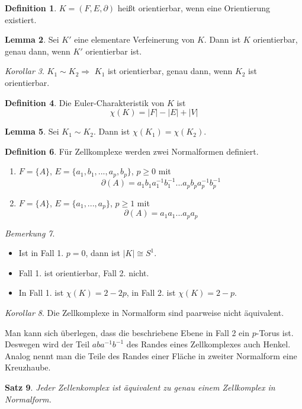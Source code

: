 \documentclass[a4paper, 12pt]{article}
\theoremstyle{plain}
\newtheorem{theorem}{Satz}[section] %
\theoremstyle{definition}
\newtheorem{definition}[theorem]{Definition} %
\theoremstyle{lemma}
\newtheorem{lemma}[theorem]{Lemma}
\theoremstyle{remark}
\newtheorem{remark}[theorem]{Bemerkung}
\theoremstyle{corollary}
\newtheorem{corollary}[theorem]{Korollar}
\theoremstyle{example}
\begin{document}
	\begin{definition}
		$K=(F,E,\partial)$ heißt orientierbar, wenn eine Orientierung existiert.
	\end{definition}
	\begin{lemma}
		Sei $K'$ eine elementare Verfeinerung von $K$. Dann ist $K$ orientierbar, genau dann, wenn $K'$ orientierbar ist.
	\end{lemma}
	\begin{corollary}
		$K_1 \sim K_2 \Rightarrow$ $K_1$ ist orientierbar, genau dann, wenn $K_2$ ist orientierbar.
	\end{corollary}
	\begin{definition}
		Die Euler-Charakteristik von $K$ ist \[\chi(K) = \left|F\right| - \left|E\right| + \left|V\right|\]
	\end{definition}
	\begin{lemma}
		Sei $K_1 \sim K_2$. Dann ist $\chi(K_1) = \chi(K_2)$.
	\end{lemma}
	\begin{definition}
		Für Zellkomplexe werden zwei Normalformen definiert.
		\begin{enumerate}
			\item $F = \{A\}$, $E = \{a_1,b_1,...,a_p,b_p\}$, $p \geq 0$ mit $$\partial(A) = a_1b_1a_1^{-1}b_1^{-1}...a_pb_pa_p^{-1}b_p^{-1}$$
			\item $F = \{A\}$, $E = \{a_1,...,a_p\}$, $p \geq 1$ mit $$\partial(A) = a_1a_1...a_pa_p$$
		\end{enumerate}
	\end{definition}
	\begin{remark}
		\begin{itemize}
			\item Ist in Fall 1. $p=0$, dann ist $\left|K\right| \cong S^1$.
			\item Fall 1. ist orientierbar, Fall 2. nicht.
			\item In Fall 1. ist $\chi(K) = 2-2p$, in Fall 2. ist $\chi(K) = 2-p$.
		\end{itemize}
	\end{remark}
	\begin{corollary}
		Die Zellkomplexe in Normalform sind paarweise nicht äquivalent.
	\end{corollary}
	Man kann sich überlegen, dass die beschriebene Ebene in Fall 2 ein $p$-Torus ist. Deswegen wird der Teil $aba^{-1}b^{-1}$ des Randes eines Zellkomplexes auch Henkel. Analog nennt man die Teile des Randes einer Fläche in zweiter Normalform eine Kreuzhaube.
	\begin{theorem}
		Jeder Zellenkomplex ist äquivalent zu genau einem Zellkomplex in Normalform.
	\end{theorem}
\end{document}

